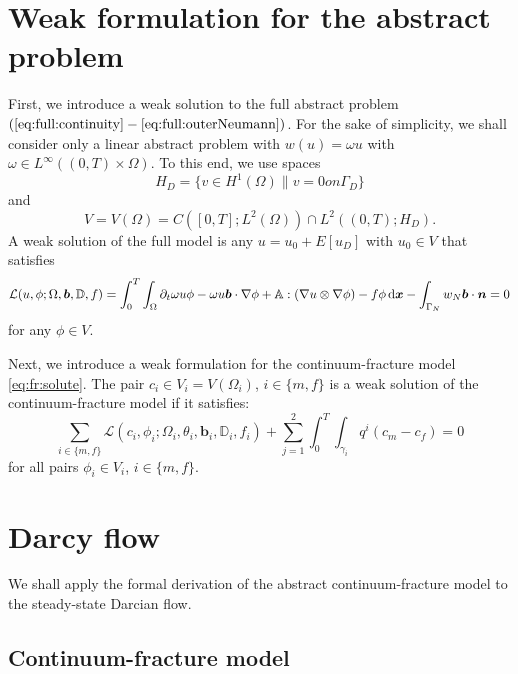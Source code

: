 \documentclass[a4paper]{article}
\def\prtl{\partial}
\def\vc#1{\mathbf{\boldsymbol{#1}}}     %
\def\tn#1{{\mathbb{#1}}}    %
\def\grad{\nabla}
\def\d {\,{\rm d}}
\begin{document}
\section{Weak formulation for the abstract problem}
First, we introduce a weak solution to the full abstract problem $(\ref{eq:full:continuity}-\ref{eq:full:outerNeumann})$.
For the sake of simplicity, we shall consider only a linear abstract problem with $w(u)=\omega u$ with $\omega\in L^\infty((0,T)\times\Omega)$.
To this end, we use spaces
\[
    H_D=\{v\in H^1(\Omega) \| v=0 on \Gamma_D\}
\]
and
\[
    V= V(\Omega) =C([0,T]; L^2(\Omega) ) \cap L^2( (0,T); H_D ).
\]    
A weak solution of the full model is any $u=u_0 + E[u_D]$ with $u_0\in V$ that satisfies
\begin{equation}
    \label{eq:solute_weak}
    \mathcal L (u, \phi; \Omega, \vc b, \tn D, f) = \int_0^T \int_{\Omega} \prtl_t \omega u\phi - \omega u \vc b  \cdot \grad \phi 
        + \tn A : (\grad u \otimes \grad \phi) - f\phi \d \vc x -\int_{\Gamma_N} w_N \vc b\cdot\vc n =0\\
\end{equation}
for any $\phi \in V$. 

Next, we introduce a weak formulation for the continuum-fracture model \eqref{eq:fr:solute}.
The pair $c_i\in V_i = V(\Omega_i)$, $i\in\{m,f\}$ is a weak solution of the continuum-fracture model
if it satisfies:
\begin{equation}
    \label{eq:fr:solute_weak}
    \sum_{i\in \{m,f\}} \mathcal L (c_i, \phi_i; \Omega_i, \theta_i, \vc b_i, \tn D_i, f_i)
    + \sum_{j=1}^2 \int_0^T \int_{\gamma_i} q^i(c_m-c_f) =0
\end{equation}
for all pairs $\phi_i\in V_i$, $i\in\{m,f\}$.






\section{Darcy flow}

We shall apply the formal derivation of the abstract continuum-fracture model to the steady-state Darcian flow.

\subsection{Continuum-fracture model}
\end{document}
